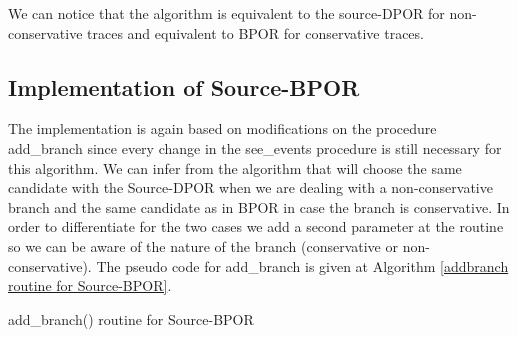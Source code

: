 We can notice that the algorithm is equivalent to the source-DPOR for non-conservative traces and equivalent to BPOR for conservative traces.

\subsection{Implementation of Source-BPOR}
The implementation is again based on modifications on the procedure add\_branch since every change in the see\_events procedure is still necessary for this algorithm.
We can infer from the algorithm that will choose the same candidate with the Source-DPOR when we are dealing with a non-conservative branch and the same candidate as in BPOR
in case the branch is conservative. In order to differentiate for the two cases we add a second parameter at the routine so we can be aware of the nature of the
branch (conservative or non-conservative). The pseudo code for add\_branch is given at Algorithm \ref{addbranch routine for Source-BPOR}.

\begin{algorithm}[H]
    \caption{add\_branch() routine for Source-BPOR}
    \label{addbranch routine for Source-BPOR}
\end{algorithm}

